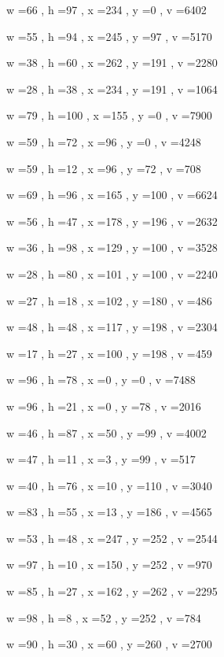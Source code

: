 \documentclass[11pt]{article}
\begin{document}
w =66 , h =97 , x =234 , y =0 , v =6402
\par
w =55 , h =94 , x =245 , y =97 , v =5170
\par
w =38 , h =60 , x =262 , y =191 , v =2280
\par
w =28 , h =38 , x =234 , y =191 , v =1064
\par
w =79 , h =100 , x =155 , y =0 , v =7900
\par
w =59 , h =72 , x =96 , y =0 , v =4248
\par
w =59 , h =12 , x =96 , y =72 , v =708
\par
w =69 , h =96 , x =165 , y =100 , v =6624
\par
w =56 , h =47 , x =178 , y =196 , v =2632
\par
w =36 , h =98 , x =129 , y =100 , v =3528
\par
w =28 , h =80 , x =101 , y =100 , v =2240
\par
w =27 , h =18 , x =102 , y =180 , v =486
\par
w =48 , h =48 , x =117 , y =198 , v =2304
\par
w =17 , h =27 , x =100 , y =198 , v =459
\par
w =96 , h =78 , x =0 , y =0 , v =7488
\par
w =96 , h =21 , x =0 , y =78 , v =2016
\par
w =46 , h =87 , x =50 , y =99 , v =4002
\par
w =47 , h =11 , x =3 , y =99 , v =517
\par
w =40 , h =76 , x =10 , y =110 , v =3040
\par
w =83 , h =55 , x =13 , y =186 , v =4565
\par
w =53 , h =48 , x =247 , y =252 , v =2544
\par
w =97 , h =10 , x =150 , y =252 , v =970
\par
w =85 , h =27 , x =162 , y =262 , v =2295
\par
w =98 , h =8 , x =52 , y =252 , v =784
\par
w =90 , h =30 , x =60 , y =260 , v =2700
\par
\newpage
\end{document}

